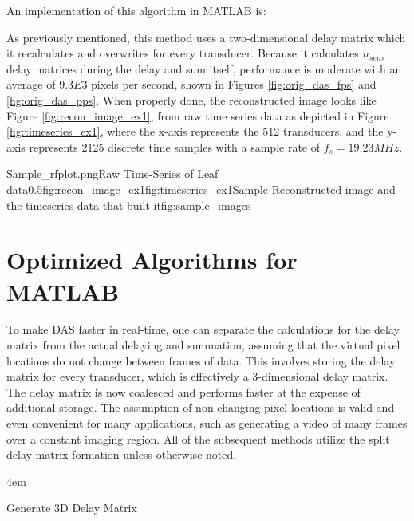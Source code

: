     An implementation of this algorithm in MATLAB is:

    


    As previously mentioned, this method uses a two-dimensional delay matrix which it recalculates and overwrites for every transducer. Because it calculates $n_{sens}$ delay matrices during the delay and sum itself, performance is moderate with an average of $9.3E3$ pixels per second, shown in Figures \ref{fig:orig_das_fps} and \ref{fig:orig_das_pps}. When properly done, the reconstructed image looks like Figure \ref{fig:recon_image_ex1}, from raw time series data as depicted in Figure \ref{fig:timeseries_ex1}, where the x-axis represents the 512 transducers, and the y-axis represents 2125 discrete time samples with a sample rate of $f_s = 19.23 MHz$.

    {Sample_rfplot.png}{Raw Time-Series of Leaf data}{0.5}{fig:recon_image_ex1}{fig:timeseries_ex1}{Sample Reconstructed image and the timeseries data that built it}{fig:sample_images}

\section{Optimized Algorithms for MATLAB}
\label{chapter3:optimized_matlab}

    To make DAS faster in real-time, one can separate the calculations for the delay matrix from the actual delaying and summation, assuming that the virtual pixel locations do not change between frames of data. This involves storing the delay matrix for every transducer, which is effectively a 3-dimensional delay matrix. The delay matrix is now coalesced and performs faster at the expense of additional storage. The assumption of non-changing pixel locations is valid and even convenient for many applications, such as generating a video of many frames over a constant imaging region. All of the subsequent methods utilize the split delay-matrix formation unless otherwise noted.

    \begin{algorithm} [H]
        \parindent4em
        \normalem
        \caption{Generate 3D Delay Matrix}\label{algo:3d_indmat}
        \end{algorithm}

